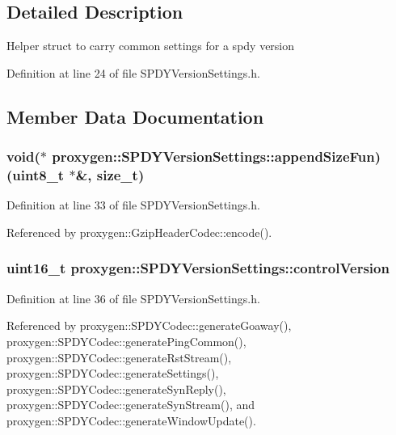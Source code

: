 \subsection{Detailed Description}
Helper struct to carry common settings for a spdy version 

Definition at line 24 of file S\+P\+D\+Y\+Version\+Settings.\+h.



\subsection{Member Data Documentation}
\subsubsection[{append\+Size\+Fun}]{\setlength{\rightskip}{0pt plus 5cm}void($\ast$ proxygen\+::\+S\+P\+D\+Y\+Version\+Settings\+::append\+Size\+Fun) (uint8\+\_\+t $\ast$\&, size\+\_\+t)}\label{structproxygen_1_1SPDYVersionSettings_a2e096c8b4bacae41548815c1ea0feda6}


Definition at line 33 of file S\+P\+D\+Y\+Version\+Settings.\+h.



Referenced by proxygen\+::\+Gzip\+Header\+Codec\+::encode().

\subsubsection[{control\+Version}]{\setlength{\rightskip}{0pt plus 5cm}uint16\+\_\+t proxygen\+::\+S\+P\+D\+Y\+Version\+Settings\+::control\+Version}\label{structproxygen_1_1SPDYVersionSettings_afee2050344b0824a66667bf9a38bf1f0}


Definition at line 36 of file S\+P\+D\+Y\+Version\+Settings.\+h.



Referenced by proxygen\+::\+S\+P\+D\+Y\+Codec\+::generate\+Goaway(), proxygen\+::\+S\+P\+D\+Y\+Codec\+::generate\+Ping\+Common(), proxygen\+::\+S\+P\+D\+Y\+Codec\+::generate\+Rst\+Stream(), proxygen\+::\+S\+P\+D\+Y\+Codec\+::generate\+Settings(), proxygen\+::\+S\+P\+D\+Y\+Codec\+::generate\+Syn\+Reply(), proxygen\+::\+S\+P\+D\+Y\+Codec\+::generate\+Syn\+Stream(), and proxygen\+::\+S\+P\+D\+Y\+Codec\+::generate\+Window\+Update().

